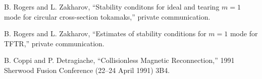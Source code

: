 \begin{thebibliography}{99}

 B. Rogers and L. Zakharov,
``Stability conditons for ideal and tearing $m=1$ mode for circular
cross-section tokamaks,''
private communication.

 B. Rogers and L. Zakharov,
``Estimates of stability conditions for $m=1$ mode for TFTR,''
private communication.

 B. Coppi and P. Detragiache,
``Collisionless Magnetic Reconnection,''
1991 Sherwood Fusion Conference (22--24 April 1991) 3B4.

\end{thebibliography}


